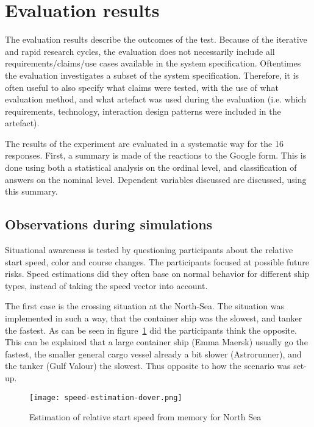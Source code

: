 \section{Evaluation results}
The evaluation results describe the outcomes of the test. Because of the iterative and rapid research cycles, the evaluation does not necessarily include all requirements/claims/use cases available in the system specification. Oftentimes the evaluation investigates a subset of the system specification. Therefore, it is often useful to also specify what claims were tested, with the use of what evaluation method, and what artefact was used during the evaluation (i.e. which requirements, technology, interaction design patterns were included in the artefact).

The results of the experiment are evaluated in a systematic way for the 16 responses. First, a summary is made of the reactions to the Google form. This is done using both a statistical analysis on the ordinal level, and classification of answers on the nominal level. Dependent variables discussed are discussed, using this summary.

\subsection{Observations during simulations}
Situational awareness is tested by questioning participants about the relative start speed, color and course changes. The participants focused at possible future risks. Speed estimations did they often base on normal behavior for different ship types, instead of taking the speed vector into account. 

The first case is the crossing situation at the North-Sea. The situation was implemented in such a way, that the container ship was the slowest, and tanker the fastest. As can be seen in figure~\ref{fig:speed-estimation-dover} did the participants think the opposite. This can be explained that a large container ship (Emma Maersk) usually go the fastest, the smaller general cargo vessel already a bit slower (Astrorunner), and the tanker (Gulf Valour) the slowest. Thus opposite to how the scenario was set-up.

\begin{figure}[h]
	\centering
	\texttt{[image: speed-estimation-dover.png]}
	\caption{Estimation of relative start speed from memory for North Sea}
	\label{fig:speed-estimation-dover}
\end{figure}

